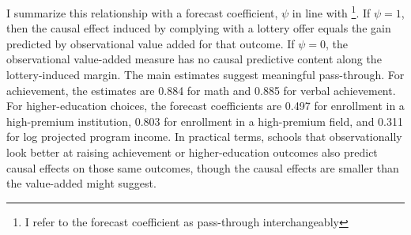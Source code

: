 \documentclass[a4paper, article, english, oneside, unknownkeysallowed, 12pt]{memoir}
\begin{document}
I summarize this relationship with a forecast coefficient, $\psi$ in line with \textcite{angrist_leveraging_2017}\footnote{I refer to the forecast coefficient as pass-through interchangeably}.
If $\psi=1$, then the causal effect induced by complying with a lottery offer equals the gain predicted by observational value added for that outcome.
If $\psi=0$, the observational value-added measure has no causal predictive content along the lottery-induced margin.
The main estimates suggest meaningful pass-through.
For achievement, the estimates are 0.884 for math and 0.885 for verbal achievement.
For higher-education choices, the forecast coefficients are 0.497 for enrollment in a high-premium institution, 0.803 for enrollment in a high-premium field, and 0.311 for log projected program income.
In practical terms, schools that observationally look better at raising achievement or higher-education outcomes also predict causal effects on those same outcomes, though the causal effects are smaller than the value-added might suggest.


\end{document}
